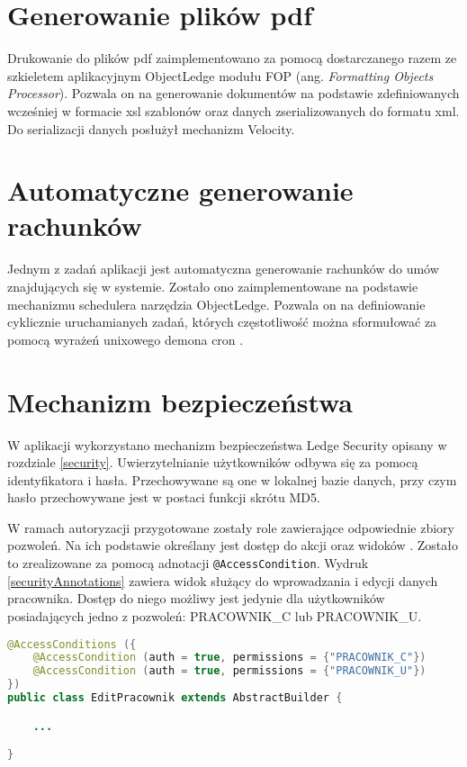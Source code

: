 \section[Generowanie plików pdf][Generowanie plików pdf]{Generowanie plików pdf}
Drukowanie do plików pdf zaimplementowano za pomocą dostarczanego razem ze szkieletem aplikacyjnym ObjectLedge modułu FOP (ang. \textit{Formatting Objects Processor}). Pozwala on na generowanie dokumentów na podstawie zdefiniowanych wcześniej w formacie xsl szablonów oraz danych zserializowanych do formatu xml. Do serializacji danych posłużył mechanizm Velocity.

\section[Automatyczne generowanie rachunków][Automatyczne generowanie rachunków]{Automatyczne generowanie rachunków}
Jednym z zadań aplikacji jest automatyczna generowanie rachunków do umów znajdujących się w systemie. Zostało ono zaimplementowane na podstawie mechanizmu schedulera narzędzia ObjectLedge. Pozwala on na definiowanie cyklicznie uruchamianych zadań, których częstotliwość można sformułować za pomocą wyrażeń unixowego demona cron \cite{cron}. 

\section[Mechanizm bezpieczeństwa][Mechanizm bezpieczeństwa]{Mechanizm bezpieczeństwa}
W aplikacji wykorzystano mechanizm bezpieczeństwa Ledge Security opisany w rozdziale \ref{security}. Uwierzytelnianie użytkowników odbywa się za pomocą identyfikatora i hasła. Przechowywane są one w lokalnej bazie danych, przy czym hasło przechowywane jest w postaci funkcji skrótu MD5. 

W ramach autoryzacji przygotowane zostały role zawierające odpowiednie zbiory pozwoleń. Na ich podstawie określany jest dostęp do akcji oraz widoków . Zostało to zrealizowane za pomocą adnotacji \texttt{@AccessCondition}. Wydruk \ref{securityAnnotations} zawiera widok służący do wprowadzania i edycji danych pracownika. Dostęp do niego możliwy jest jedynie dla użytkowników posiadających jedno z pozwoleń: PRACOWNIK\_C lub PRACOWNIK\_U.

\begin{lstlisting}[language=Java,style=outcode,showstringspaces=false,caption=Dostęp do widoku edycji danych pracownika zabezpieczony za pomocą adnotacji,label={securityAnnotations}]
@AccessConditions ({
	@AccessCondition (auth = true, permissions = {"PRACOWNIK_C"})
	@AccessCondition (auth = true, permissions = {"PRACOWNIK_U"})
})
public class EditPracownik extends AbstractBuilder {

	...

}
\end{lstlisting}

